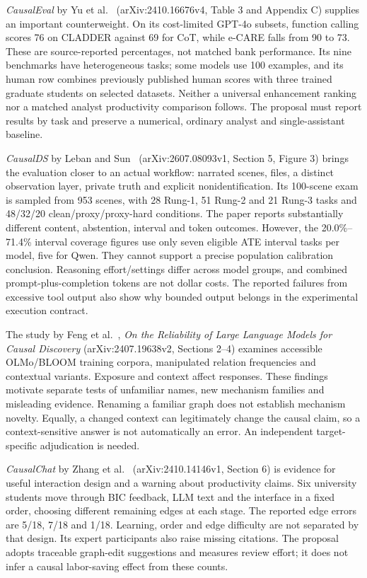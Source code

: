 \emph{CausalEval} by Yu et al.~\citep{exec13_census_causaleval}
(arXiv:2410.16676v4, Table 3 and Appendix C) supplies an important
counterweight. On its cost-limited GPT-4o subsets, function calling
scores 76 on CLADDER against 69 for CoT, while e-CARE falls from 90 to
73. These are source-reported percentages, not matched bank performance.
Its nine benchmarks have heterogeneous tasks; some models use 100
examples, and its human row combines previously published human scores
with three trained graduate students on selected datasets. Neither a
universal enhancement ranking nor a matched analyst productivity
comparison follows. The proposal must report results by task and
preserve a numerical, ordinary analyst and single-assistant baseline.

\emph{CausalDS} by Leban and Sun~\citep{v12_la_2607_08093}
(arXiv:2607.08093v1, Section 5, Figure 3) brings the evaluation closer
to an actual workflow: narrated scenes, files, a distinct observation
layer, private truth and explicit nonidentification. Its 100-scene exam
is sampled from 953 scenes, with 28 Rung-1, 51 Rung-2 and 21 Rung-3
tasks and 48/32/20 clean/proxy/proxy-hard conditions. The paper reports
substantially different content, abstention, interval and token
outcomes. However, the 20.0\%--71.4\% interval coverage figures use only
seven eligible ATE interval tasks per model, five for Qwen. They cannot
support a precise population calibration conclusion. Reasoning
effort/settings differ across model groups, and combined
prompt-plus-completion tokens are not dollar costs. The reported
failures from excessive tool output also show why bounded output belongs
in the experimental execution contract.

The study by Feng et al.~\citep{v12_la_2407_19638}, \emph{On the
Reliability of Large Language Models for Causal Discovery}
(arXiv:2407.19638v2, Sections 2--4) examines accessible OLMo/BLOOM
training corpora, manipulated relation frequencies and contextual
variants. Exposure and context affect responses. These findings motivate
separate tests of unfamiliar names, new mechanism families and
misleading evidence. Renaming a familiar graph does not establish
mechanism novelty. Equally, a changed context can legitimately change
the causal claim, so a context-sensitive answer is not automatically an
error. An independent target-specific adjudication is needed.

\emph{CausalChat} by Zhang et al.~\citep{v12_la_2410_14146}
(arXiv:2410.14146v1, Section 6) is evidence for useful interaction
design and a warning about productivity claims. Six university students
move through BIC feedback, LLM text and the interface in a fixed order,
choosing different remaining edges at each stage. The reported edge
errors are 5/18, 7/18 and 1/18. Learning, order and edge difficulty are
not separated by that design. Its expert participants also raise missing
citations. The proposal adopts traceable graph-edit suggestions and
measures review effort; it does not infer a causal labor-saving effect
from these counts.


